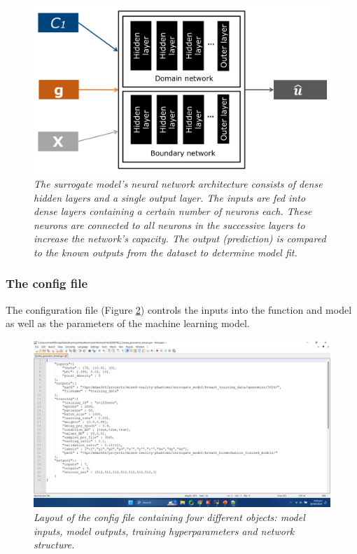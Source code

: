 \documentclass[11pt]{article}
\begin{document}
\begin{figure}[H]
    \centering
    \includegraphics[scale=0.75]{Images/breast/machine_learning/network_diagram.png}
    \caption{\textit{\label{fig1}The surrogate model's neural network architecture consists of dense hidden layers and a single output layer. The inputs are fed into dense layers containing a certain number of neurons each. These neurons are connected to all neurons in the successive layers to increase the network's capacity. The output (prediction) is compared to the known outputs from the dataset to determine model fit.}}
\end{figure}

\subsubsection{The config file}
The configuration file (Figure \ref{fig2}) controls the inputs into the function and model as well as the parameters of the machine learning model.

\begin{figure}[H]
    \centering
    \includegraphics[scale=1.1]{Images/breast/machine_learning/config_file.png}
    \caption{\textit{\label{fig2}Layout of the config file containing four different objects: model inputs, model outputs, training hyperparameters and network structure.}}
\end{figure}
\end{document}
